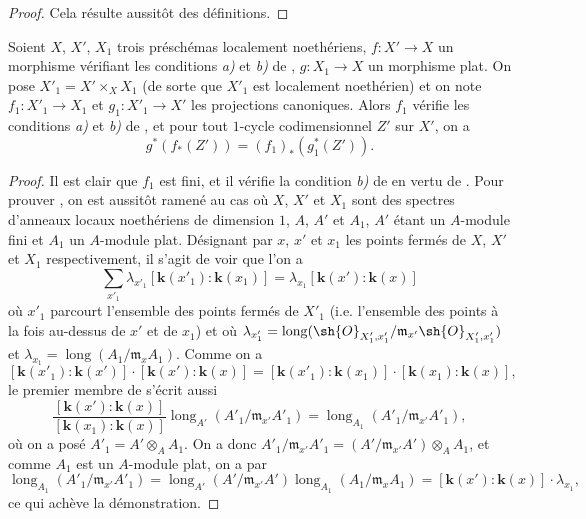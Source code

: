 \begin{proof}
Cela résulte aussitôt des définitions.
\end{proof}

\begin{proposition}[21.10.16]
\label{IV.21.10.16}
Soient $X$, $X'$, $X_1$ trois préschémas localement noethériens, $f:X'\to X$ un morphisme vérifiant les conditions \emph{a)} et \emph{b)} de , $g:X_1\to X$ un morphisme plat.
On pose $X'_1=X'\times_XX_1$ (de sorte que $X'_1$ est localement noethérien) et on note $f_1:X'_1\to X_1$ et $g_1:X'_1\to X'$ les projections canoniques.
Alors $f_1$ vérifie les conditions \emph{a)} et \emph{b)} de , et pour tout $1$-cycle codimensionnel $Z'$ sur $X'$, on a
\[
\label{IV.21.10.16.1}
  g^*(f_*(Z'))=(f_1)_*(g_1^*(Z')).
  \tag{21.10.16.1}
\]
\end{proposition}

\begin{proof}
Il est clair que $f_1$ est fini, et il vérifie la condition \emph{b)} de  en vertu de .
Pour prouver , on est aussitôt ramené au cas où $X$, $X'$ et $X_1$ sont des spectres d'anneaux locaux noethériens de dimension $1$, $A$, $A'$ et $A_1$, $A'$ étant un $A$-module fini et $A_1$ un $A$-module plat.
Désignant par $x$, $x'$ et $x_1$ les points fermés de $X$, $X'$ et $X_1$ respectivement, il s'agit de voir que l'on a
\[
\label{IV.21.10.16.2}
  \sum_{x'_1}\lambda_{x'_1}[\boldsymbol{k}(x'_1):\boldsymbol{k}(x_1)]
  =\lambda_{x_1}[\boldsymbol{k}(x'):\boldsymbol{k}(x)]
  \tag{21.10.16.2}
\]
où $x'_1$ parcourt l'ensemble des points fermés de $X'_1$ (i.e. l'ensemble des points à la fois au-dessus de $x'$ et de $x_1$) et où $\lambda_{x'_1}=\operatorname{long}(\sh{O}_{X'_1,x'_1}/\mathfrak{m}_{x'}\sh{O}_{X'_1,x'_1})$ et $\lambda_{x_1}=\operatorname{long}(A_1/\mathfrak{m}_xA_1)$.
Comme on a
\[
  [\boldsymbol{k}(x'_1):\boldsymbol{k}(x')]\cdot[\boldsymbol{k}(x'):\boldsymbol{k}(x)]
  =[\boldsymbol{k}(x'_1):\boldsymbol{k}(x_1)]\cdot[\boldsymbol{k}(x_1):\boldsymbol{k}(x)],
\]
le premier membre de  s'écrit aussi
\[
  \frac{[\boldsymbol{k}(x'): \boldsymbol{k}(x)]}{[\boldsymbol{k}(x_1): \boldsymbol{k}(x)]}
  \operatorname{long}_{A'}(A'_1/\mathfrak{m}_{x'}A'_1)
  =\operatorname{long}_{A_1}(A'_1/\mathfrak{m}_{x'}A'_1),
\]
où on a posé $A'_1=A'\otimes_AA_1$.
On a donc $A'_1/\mathfrak{m}_{x'}A'_1=(A'/\mathfrak{m}_{x'}A')\otimes_AA_1$, et comme $A_1$ est un $A$-module plat, on a par 
\[
  \operatorname{long}_{A_1}(A'_1/\mathfrak{m}_{x'}A'_1)
  =\operatorname{long}_{A'}(A'/\mathfrak{m}_{x'}A')\operatorname{long}_{A_1}(A_1/\mathfrak{m}_xA_1)
  =[\boldsymbol{k}(x'): \boldsymbol{k}(x)]\cdot\lambda_{x_1},
\]
ce qui achève la démonstration.
\end{proof}

